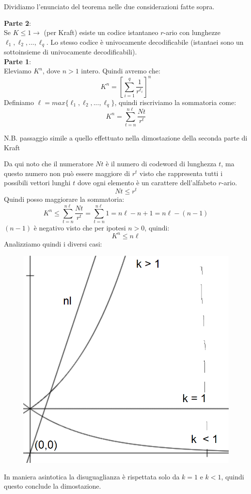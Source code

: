 \begin{dimostrazione}
Dividiamo l'enunciato del teorema nelle due considerazioni fatte sopra.


\vspace{2mm}
\textbf{Parte 2}:\\
Se $K \leq 1 \rightarrow$ (per Kraft) esiste un codice istantaneo $r$-ario con lunghezze $\ell_1,\ell_2,...,\ell_q$.
Lo stesso codice è univocamente decodificabile (istantaei sono un sottoinsieme di univocamente decodificabili).\\


\vspace{2mm}
\textbf{Parte 1}:\\
Eleviamo $K^n$, dove $n>1$ intero. Quindi avremo che:
\begin{equation*}
K^n=[\sum_{i=1}^{q}\frac{1}{r^{\ell_i}}]^n
\end{equation*}
Definiamo $\ell=max\{\ell_1,\ell_2,...,\ell_q\}$, quindi riscriviamo la sommatoria come:
\begin{equation*}
K^n=\sum_{t=n}^{n\ell}\frac{Nt}{r^{t}}
\end{equation*}
\begin{center}
	N.B. passaggio simile a quello effettuato nella dimostazione della seconda parte di Kraft
\end{center}
Da qui noto che il numeratore $Nt$ è il numero di codeword di lunghezza $t$, ma questo numero non può essere maggiore di $r^t$ visto che rappresenta tutti i possibili vettori lunghi $t$ dove ogni elemento è un carattere dell'alfabeto $r$-ario.
\begin{equation*}
Nt \leq r^t
\end{equation*}
Quindi posso maggiorare la sommatoria:
\begin{equation*}
K^n \leq \sum_{t=n}^{n\ell}\frac{Nt}{r^{t}} = \sum_{t=n}^{n\ell}1 = n\ell-n+1= n\ell-(n-1)
\end{equation*}
$(n-1)$ è negativo visto che per ipotesi $n > 0$, quindi:
\begin{equation*}
K^n \leq n\ell
\end{equation*}
Analizziamo quindi i diversi casi:
\begin{figure}[h]
	\centering
	\includegraphics[width=0.5\linewidth]{immagini/img16}
\end{figure}


In maniera asintotica la disuguaglianza è rispettata solo da $k=1$ e $k<1$, quindi questo conclude la dimostazione.
\end{dimostrazione}


